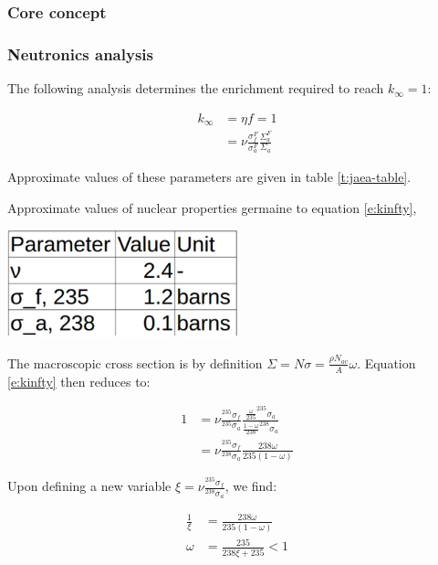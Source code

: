 \documentclass[12pt]{article}
\begin{document}
\subsubsection{Core concept}
\subsubsection{Neutronics analysis}
The following analysis determines the enrichment required to reach $k_\infty = 1$:

\begin{align}
k_\infty &= \eta f = 1 \\
 &= \nu \frac{\sigma_f^F}{\sigma_a^F} \frac{\Sigma_a^F}{\Sigma_a} \label{e:kinfty}
\end{align}

Approximate values of these parameters are given in table \ref{t:jaea-table}.

\begin{table}[H]
\begin{center}
  \caption{Approximate values of nuclear properties germaine to equation \ref{e:kinfty}, \cite{jaea}}
  \label{t:jaea-table}
  \includegraphics[width=0.5\textwidth]{full-spectrum-nuke-data}
\end{center}
\end{table}


The macroscopic cross section is by definition $\Sigma = N \sigma = \frac{\rho N_{av}}{A} \omega$. Equation \ref{e:kinfty} then reduces to:

\begin{align}
1 &= \nu \frac{^{235}\sigma_f}{^{235}\sigma_a} \frac{\frac{\omega}{235} ^{235} \sigma_a}{\frac{1 - \omega}{238} ^{238} \sigma_a} \\
 &= \nu \frac{^{235} \sigma_f}{^{238} \sigma_a} \frac{238 \omega}{235 (1 - \omega)} 
\end{align}

Upon defining a new variable $\xi = \nu \frac{^{235} \sigma_f}{^{238} \sigma_a}$, we find:

\begin{align}
\frac{1}{\xi} &= \frac{238 \omega}{235 (1 - \omega)} \\
\omega &= \frac{235}{238 \xi + 235} < 1
\end{align} 
\end{document}
